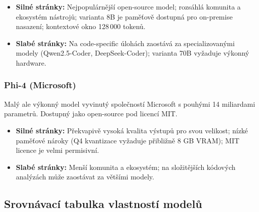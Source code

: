 \begin{itemize}
    \item \textbf{Silné stránky:} Nejpopulárnější open-source model; rozsáhlá komunita a ekosystém nástrojů; varianta 8B je paměťově dostupná pro on-premise nasazení; kontextové okno 128\,000 tokenů.
    \item \textbf{Slabé stránky:} Na code-specific úlohách zaostává za specializovanými modely (Qwen2.5-Coder, DeepSeek-Coder); varianta 70B vyžaduje výkonný hardware.
\end{itemize}

\subsubsection*{Phi-4 (Microsoft)}

Malý ale výkonný model vyvinutý společností Microsoft \cite{phi4_2024} s pouhými 14 miliardami parametrů.
Dostupný jako open-source pod licencí MIT.

\begin{itemize}
    \item \textbf{Silné stránky:} Překvapivě vysoká kvalita výstupů pro svou velikost; nízké paměťové nároky (Q4 kvantizace vyžaduje přibližně 8 GB VRAM); MIT licence je velmi permisivní.
    \item \textbf{Slabé stránky:} Menší komunita a ekosystém; na složitějších kódových analýzách může zaostávat za většími modely.
\end{itemize}

\subsection{Srovnávací tabulka vlastností modelů}
\label{subsec:models-comparison-table}

